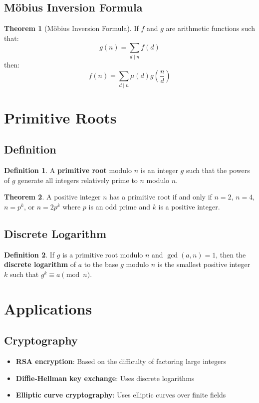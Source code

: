 \documentclass[11pt]{article}
\theoremstyle{definition}
\newtheorem{definition}{Definition}[section]
\newtheorem{theorem}{Theorem}[section]
\begin{document}
\subsection{Möbius Inversion Formula}
\begin{theorem}[Möbius Inversion Formula]
If $f$ and $g$ are arithmetic functions such that:
$$g(n) = \sum_{d \mid n} f(d)$$
then:
$$f(n) = \sum_{d \mid n} \mu(d) g\left(\frac{n}{d}\right)$$
\end{theorem}

\section{Primitive Roots}

\subsection{Definition}
\begin{definition}
A \textbf{primitive root} modulo $n$ is an integer $g$ such that the powers of $g$ generate all integers relatively prime to $n$ modulo $n$.
\end{definition}

\begin{theorem}
A positive integer $n$ has a primitive root if and only if $n = 2$, $n = 4$, $n = p^k$, or $n = 2p^k$ where $p$ is an odd prime and $k$ is a positive integer.
\end{theorem}

\subsection{Discrete Logarithm}
\begin{definition}
If $g$ is a primitive root modulo $n$ and $\gcd(a,n) = 1$, then the \textbf{discrete logarithm} of $a$ to the base $g$ modulo $n$ is the smallest positive integer $k$ such that $g^k \equiv a \pmod{n}$.
\end{definition}

\section{Applications}

\subsection{Cryptography}
\begin{itemize}
    \item \textbf{RSA encryption}: Based on the difficulty of factoring large integers
    \item \textbf{Diffie-Hellman key exchange}: Uses discrete logarithms
    \item \textbf{Elliptic curve cryptography}: Uses elliptic curves over finite fields
\end{itemize}
\end{document}
